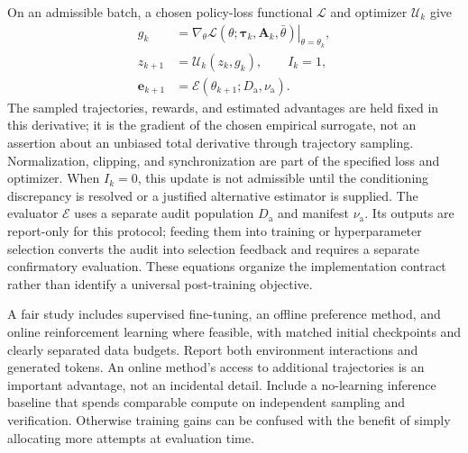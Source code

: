 On an admissible batch, a chosen policy-loss functional $\mathcal L$ and optimizer $\mathcal U_k$ give
\begin{equation}
\label{eq:C08:mathematical-update}
\begin{aligned}
 g_k&=\left.\nabla_\theta
 \mathcal L(\theta;\boldsymbol\tau_k,\boldsymbol A_k,\bar\theta)
 \right|_{\theta=\theta_k},\\
 z_{k+1}&=\mathcal U_k(z_k,g_k),\qquad I_k=1,\\
 \boldsymbol e_{k+1}
 &=\mathcal E(\theta_{k+1};D_{\mathrm a},\nu_{\mathrm a}).
\end{aligned}
\end{equation}
The sampled trajectories, rewards, and estimated advantages are held fixed in this derivative; it is the gradient of the chosen empirical surrogate, not an assertion about an unbiased total derivative through trajectory sampling. Normalization, clipping, and synchronization are part of the specified loss and optimizer. When $I_k=0$, this update is not admissible until the conditioning discrepancy is resolved or a justified alternative estimator is supplied. The evaluator $\mathcal E$ uses a separate audit population $D_{\mathrm a}$ and manifest $\nu_{\mathrm a}$. Its outputs are report-only for this protocol; feeding them into training or hyperparameter selection converts the audit into selection feedback and requires a separate confirmatory evaluation. These equations organize the implementation contract rather than identify a universal post-training objective.

A fair study includes supervised fine-tuning, an offline preference method, and online reinforcement learning where feasible, with matched initial checkpoints and clearly separated data budgets. Report both environment interactions and generated tokens. An online method's access to additional trajectories is an important advantage, not an incidental detail. Include a no-learning inference baseline that spends comparable compute on independent sampling and verification. Otherwise training gains can be confused with the benefit of simply allocating more attempts at evaluation time.

